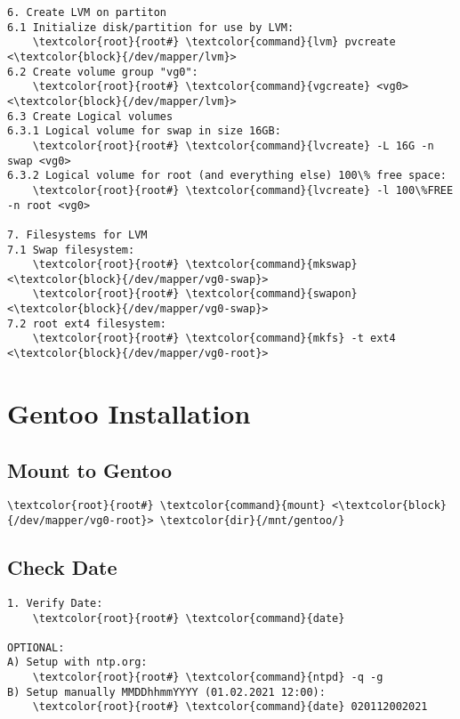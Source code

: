 \documentclass[10pt, a4paper, onecolumn, openany]{book}         %
\begin{document}
\begin{Verbatim}[commandchars=\\\{\}]
6. Create LVM on partiton
6.1 Initialize disk/partition for use by LVM:
    \textcolor{root}{root#} \textcolor{command}{lvm} pvcreate <\textcolor{block}{/dev/mapper/lvm}>
6.2 Create volume group "vg0":
    \textcolor{root}{root#} \textcolor{command}{vgcreate} <vg0> <\textcolor{block}{/dev/mapper/lvm}>
6.3 Create Logical volumes
6.3.1 Logical volume for swap in size 16GB:
    \textcolor{root}{root#} \textcolor{command}{lvcreate} -L 16G -n swap <vg0>
6.3.2 Logical volume for root (and everything else) 100\% free space:
    \textcolor{root}{root#} \textcolor{command}{lvcreate} -l 100\%FREE -n root <vg0>

7. Filesystems for LVM
7.1 Swap filesystem:
    \textcolor{root}{root#} \textcolor{command}{mkswap} <\textcolor{block}{/dev/mapper/vg0-swap}>
    \textcolor{root}{root#} \textcolor{command}{swapon} <\textcolor{block}{/dev/mapper/vg0-swap}>
7.2 root ext4 filesystem:
    \textcolor{root}{root#} \textcolor{command}{mkfs} -t ext4 <\textcolor{block}{/dev/mapper/vg0-root}>
\end{Verbatim}



\chapter{Gentoo Installation}
\section{Mount to Gentoo}
\begin{Verbatim}[commandchars=\\\{\}]
    \textcolor{root}{root#} \textcolor{command}{mount} <\textcolor{block}{/dev/mapper/vg0-root}> \textcolor{dir}{/mnt/gentoo/}
\end{Verbatim}

\section{Check Date}
\begin{Verbatim}[commandchars=\\\{\}]
1. Verify Date:
    \textcolor{root}{root#} \textcolor{command}{date}

OPTIONAL:
A) Setup with ntp.org:
    \textcolor{root}{root#} \textcolor{command}{ntpd} -q -g
B) Setup manually MMDDhhmmYYYY (01.02.2021 12:00):
    \textcolor{root}{root#} \textcolor{command}{date} 020112002021
\end{Verbatim}
\end{document}
